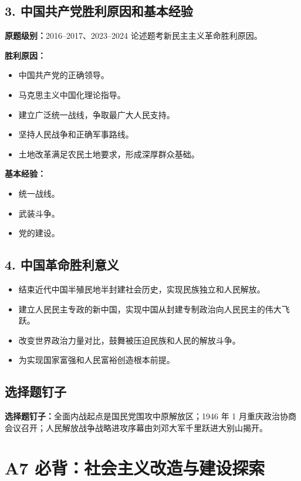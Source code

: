 \documentclass[UTF8,zihao=-4]{ctexart}
\newcommand{\exam}[1]{\textcolor{accent}{\bfseries 原题级别：}#1}
\newcommand{\pin}[1]{\textcolor{main}{\bfseries 选择题钉子：}#1}
\begin{document}
\subsection{3. 中国共产党胜利原因和基本经验}
\exam{2016--2017、2023--2024 论述题考新民主主义革命胜利原因。}

\textbf{胜利原因：}
\begin{itemize}
  \item 中国共产党的正确领导。
  \item 马克思主义中国化理论指导。
  \item 建立广泛统一战线，争取最广大人民支持。
  \item 坚持人民战争和正确军事路线。
  \item 土地改革满足农民土地要求，形成深厚群众基础。
\end{itemize}

\textbf{基本经验：}
\begin{itemize}
  \item 统一战线。
  \item 武装斗争。
  \item 党的建设。
\end{itemize}

\subsection{4. 中国革命胜利意义}
\begin{itemize}
  \item 结束近代中国半殖民地半封建社会历史，实现民族独立和人民解放。
  \item 建立人民民主专政的新中国，实现中国从封建专制政治向人民民主的伟大飞跃。
  \item 改变世界政治力量对比，鼓舞被压迫民族和人民的解放斗争。
  \item 为实现国家富强和人民富裕创造根本前提。
\end{itemize}

\subsection{选择题钉子}
\pin{全面内战起点是国民党围攻中原解放区；1946 年 1 月重庆政治协商会议召开；人民解放战争战略进攻序幕由刘邓大军千里跃进大别山揭开。}

\newpage

\section{A7 必背：社会主义改造与建设探索}
\end{document}
